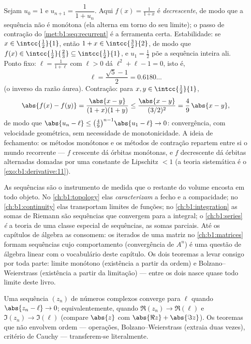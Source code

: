 \begin{example}\label{ex:b1:seq:golden}
Sejam $u_0 = 1$ e $u_{n+1} = \dfrac{1}{1 + u_n}$. Aqui $f(x) =
\frac{1}{1+x}$ é \emph{decrescente}, de modo que a sequência não é
monótona (ela alterna em torno do seu limite); o passo de contração
do \cref{met:b1:seq:recurrent} é a ferramenta certa. Estabilidade: se
$x \in \intcc{\frac12}{1}$, então $1 + x \in
\intcc{\frac32}{2}$, de modo que $f(x) \in \intcc{\frac12}{\frac23}
\subseteq \intcc{\frac12}{1}$, e $u_1 = \frac12$ põe a
sequência inteira ali. Ponto fixo: $\ell = \frac{1}{1+\ell}$
com $\ell > 0$ dá $\ell^2 + \ell - 1 = 0$, isto é,
\[
\ell = \frac{\sqrt5 - 1}{2} = 0.6180\dots
\]
(o inverso da razão áurea). Contração: para $x, y \in
\intcc{\frac12}{1}$,
\[
\abs{f(x) - f(y)} = \frac{\abs{x - y}}{(1+x)(1+y)}
\leq \frac{\abs{x-y}}{(3/2)^2} = \frac49\,\abs{x - y} ,
\]
de modo que $\abs{u_n - \ell} \leq \bigl(\frac49\bigr)^{n-1}\abs{u_1 -
\ell} \to 0$: convergência, com velocidade geométrica, sem
necessidade de monotonicidade. A ideia de fechamento: os métodos
monótonos e os métodos de contração repartem entre si o mundo
recorrente --- $f$ crescente dá órbitas monótonas, e $f$ decrescente dá
órbitas alternadas domadas por uma constante de Lipschitz $< 1$ (a
teoria sistemática é o \cref{exo:b1:derivative:11}).
\end{example}

\begin{remark}
As sequências são o instrumento de medida que o restante do volume
encosta em todo objeto. No \cref{ch:b1:topology} elas
\emph{caracterizam} a fecho e a compacidade; no
\cref{ch:b1:continuity} elas transportam limites de funções; no
\cref{ch:b1:integration} as somas de Riemann são sequências que convergem
para a integral; o \cref{ch:b1:series} \emph{é} a teoria de uma
classe especial de sequências, as somas parciais. Até os capítulos de
álgebra as consomem: os iterados de uma matriz no
\cref{ch:b1:matrices} formam sequências cujo comportamento
(convergência de $A^n$) é uma questão de álgebra linear com o
vocabulário deste capítulo. Os dois teoremas a levar consigo por toda
parte: limite monótono (existência a partir da ordem) e
Bolzano--Weierstrass (existência a partir da limitação) --- entre os
dois nasce quase todo limite deste livro.
\end{remark}

\begin{remark}
Uma sequência $(z_n)$ de números complexos converge para $\ell$ quando
$\abs{z_n - \ell} \to 0$; equivalentemente, quando $\Re(z_n) \to \Re(\ell)$
e $\Im(z_n) \to \Im(\ell)$ (compare $\abs{z}$ com $\abs{\Re z} +
\abs{\Im z}$). Os teoremas que não envolvem ordem --- operações,
Bolzano--Weierstrass (extraia duas vezes), critério de Cauchy ---
transferem-se literalmente.
\end{remark}

